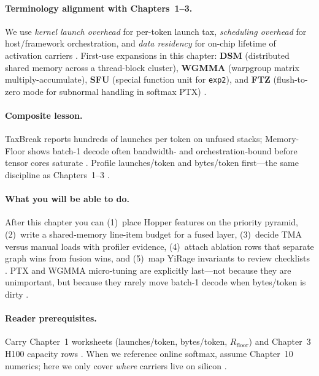 \paragraph{Terminology alignment with Chapters~1--3.}
We use \emph{kernel launch overhead} for per-token launch tax, \emph{scheduling overhead} for host/framework orchestration, and \emph{data residency} for on-chip lifetime of activation carriers \citep{taxbreak2026,chen2020compilerbasedhardw,memoryfloor2026}.
First-use expansions in this chapter: \textbf{DSM} (distributed shared memory across a thread-block cluster), \textbf{WGMMA} (warpgroup matrix multiply-accumulate), \textbf{SFU} (special function unit for \texttt{exp2}), and \textbf{FTZ} (flush-to-zero mode for subnormal handling in softmax PTX) \citep{nvidia2022hopper,liu2024deepseekv3,dao2022flashattention}.

\paragraph{Composite lesson.}
TaxBreak reports hundreds of launches per token on unfused stacks; Memory-Floor shows batch-1 decode often bandwidth- and orchestration-bound before tensor cores saturate \citep{taxbreak2026,memoryfloor2026}.
Profile launches/token and bytes/token first---the same discipline as Chapters~1--3 \citep{patel2025llminference}.

\paragraph{What you will be able to do.}
After this chapter you can (1)~place Hopper features on the priority pyramid, (2)~write a shared-memory line-item budget for a fused layer, (3)~decide TMA versus manual loads with profiler evidence, (4)~attach ablation rows that separate graph wins from fusion wins, and (5)~map YiRage invariants to review checklists \citep{yirage2026,taxbreak2026,memoryfloor2026}.
PTX and WGMMA micro-tuning are explicitly last---not because they are unimportant, but because they rarely move batch-1 decode when bytes/token is dirty \citep{patel2025llminference,dao2022flashattention}.

\paragraph{Reader prerequisites.}
Carry Chapter~1 worksheets (launches/token, bytes/token, $R_{\mathrm{floor}}$) and Chapter~3 H100 capacity rows \citep{taxbreak2026,memoryfloor2026,yirage2026}.
When we reference online softmax, assume Chapter~10 numerics; here we only cover \emph{where} carriers live on silicon \citep{dao2022flashattention,dao2023flashdecoding}.

